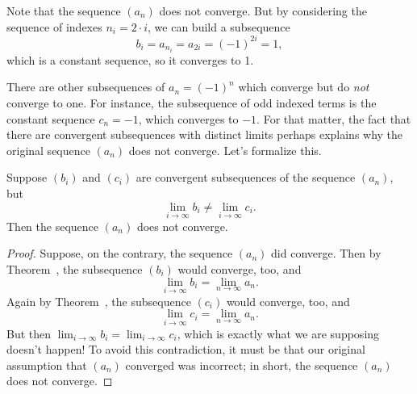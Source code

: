 \documentclass{ximera}
\newcommand{\ds}{\displaystyle}
\begin{document}
\begin{solution}
Note that the sequence $(a_n)$ does not converge.  But by considering the sequence of indexes $n_i = 2 \cdot i$, we can build a subsequence
$$
b_i = a_{n_i} = a_{2i} = (-1)^{2i} = 1,
$$
which is a constant sequence, so it converges to 1.
\end{solution}

There are other subsequences of $a_n = (-1)^n$ which converge but do
\textit{not} converge to one.  For instance, the subsequence of odd
indexed terms is the constant sequence $c_n = -1$, which converges to
$-1$.  For that matter, the fact that there are convergent
subsequences with distinct limits perhaps explains why the original
sequence $(a_n)$ does not converge.  Let's formalize this.

\begin{corollary}
  \label{corollary:different-subsequences-then-diverge}

  Suppose $(b_i)$ and $(c_i)$ are convergent subsequences of the sequence $(a_n)$, but
  $$
  \ds\lim_{i \to \infty} b_i \neq \ds\lim_{i \to \infty} c_i.
  $$
  Then the sequence $(a_n)$ does not converge.
\end{corollary}

\begin{proof}
  Suppose, on the contrary, the sequence $(a_n)$ did converge.  Then
  by Theorem~, the subsequence
  $(b_i)$ would converge, too, and
  $$
  \ds\lim_{i \to \infty} b_i = \ds\lim_{n \to \infty} a_n.
  $$
  Again by Theorem~, the subsequence
  $(c_i)$ would converge, too, and
  $$
  \ds\lim_{i \to \infty} c_i = \ds\lim_{n \to \infty} a_n.
  $$
  But then $\ds\lim_{i \to \infty} b_i = \ds\lim_{i \to \infty} c_i$,
  which is exactly what we are supposing doesn't happen!  To avoid
  this contradiction, it must be that our original assumption that
  $(a_n)$ converged was incorrect; in short, the sequence $(a_n)$ does
  not converge.
\end{proof}
\end{document}
